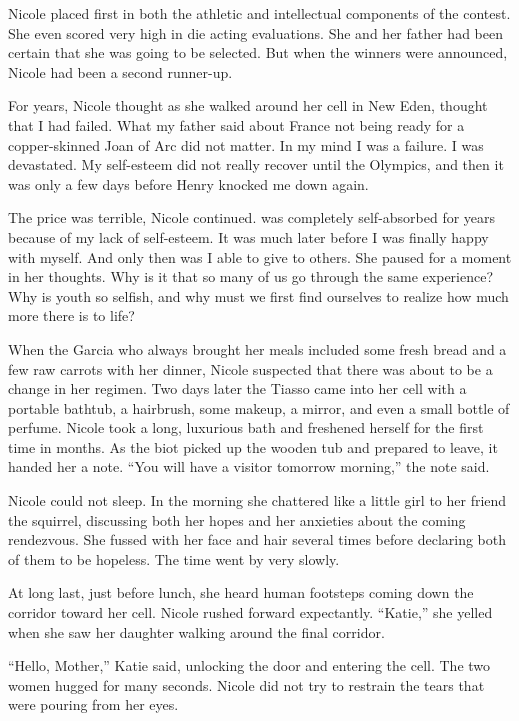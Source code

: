 \documentclass[]{article}
\begin{document}
{{Nicole placed first in both the athletic and intellectual components of the contest.  She even scored very high in die acting evaluations.  She and her father had been certain that she was going to be selected.  But when the winners were announced, Nicole had been a second runner-up.

For years, Nicole thought as she walked around her cell in New Eden, thought that I had failed.  What my father said about France not being ready for a copper-skinned Joan of Arc did not matter.  In my mind I was a failure.  I was devastated.  My self-esteem did not really recover until the Olympics, and then it was only a few days before Henry knocked me down again.

The price was terrible, Nicole continued.  was completely self-absorbed for years because of my lack of self-esteem.  It was much later before I was finally happy with myself.  And only then was I able to give to others.  She paused for a moment in her thoughts.  Why is it that so many of us go through the same experience? Why is youth so selfish, and why must we first find ourselves to realize how much more there is to life?

When the Garcia who always brought her meals included some fresh bread and a few raw carrots with her dinner, Nicole suspected that there was about to be a change in her regimen.  Two days later the Tiasso came into her cell with a portable bathtub, a hairbrush, some makeup, a mirror, and even a small bottle of perfume.  Nicole took a long, luxurious bath and freshened herself for the first time in months.  As the biot picked up the wooden tub and prepared to leave, it handed her a note.  “You will have a visitor tomorrow morning,” the note said.

Nicole could not sleep.  In the morning she chattered like a little girl to her friend the squirrel, discussing both her hopes and her anxieties about the coming rendezvous.  She fussed with her face and hair several times before declaring both of them to be hopeless.  The time went by very slowly.

At long last, just before lunch, she heard human footsteps coming down the corridor toward her cell.  Nicole rushed forward expectantly.  “Katie,” she yelled when she saw her daughter walking around the final corridor.

“Hello, Mother,” Katie said, unlocking the door and entering the cell.  The two women hugged for many seconds.  Nicole did not try to restrain the tears that were pouring from her eyes.

}}
\end{document}
